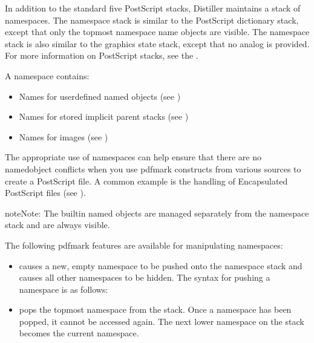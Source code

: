 \documentclass[letterpaper,12pt,english,openany,oneside]{sphinxmanual}
\begin{document}
In addition to the standard five PostScript stacks, Distiller maintains a stack of namespaces. The namespace stack is similar to the PostScript dictionary stack, except that only the top\sphinxhyphen{}most namespace name objects are visible. The namespace stack is also similar to the graphics state stack, except that no  analog is provided. For more information on PostScript stacks, see the  .

A namespace contains:
\begin{itemize}
\item {} 
Names for user\sphinxhyphen{}defined named objects (see )

\item {} 
Names for stored implicit parent stacks (see )

\item {} 
Names for images (see )

\end{itemize}

The appropriate use of namespaces can help ensure that there are no named\sphinxhyphen{}object conflicts when you use pdfmark constructs from various sources to create a PostScript file. A common example is the handling of Encapsulated PostScript files (see ).

\begin{sphinxadmonition}{note}{Note:}
The built\sphinxhyphen{}in named objects are managed separately from the namespace stack and are always visible.
\end{sphinxadmonition}

The following pdfmark features are available for manipulating namespaces:
\begin{itemize}
\item {} 
 causes a new, empty namespace to be pushed onto the namespace stack and causes all other namespaces to be hidden. The syntax for pushing a namespace is as follows:

\end{itemize}

\begin{sphinxVerbatim}[commandchars=\\\{\}]
\PYG{p}{[}  
\end{sphinxVerbatim}
\begin{itemize}
\item {} 
 pops the topmost namespace from the stack. Once a namespace has been popped, it cannot be accessed again. The next lower namespace on the stack becomes the current namespace.

\end{itemize}
\end{document}
